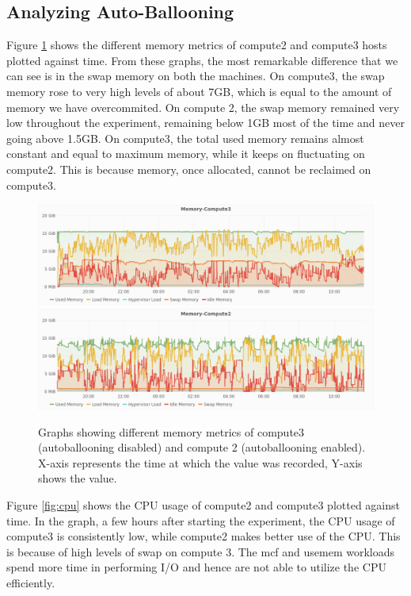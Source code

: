 \subsection{Analyzing Auto-Ballooning}
Figure \ref{fig:mem} shows the different memory metrics of compute2 and compute3 hosts plotted against time. From these graphs, the most remarkable difference that we can see is in the swap memory on both the machines. On compute3, the swap memory rose to very high levels of about 7GB, which is equal to the amount of memory we have overcommited. On compute 2, the swap memory remained very low throughout the experiment, remaining below 1GB most of the time and never going above 1.5GB. On compute3, the total used memory remains almost constant and equal to maximum memory, while it keeps on fluctuating on compute2. This is because memory, once allocated, cannot be reclaimed on compute3.
\begin{figure}
  \centering
  \includegraphics[width=\textwidth]{mem-compute3.png}
   \includegraphics[width=\textwidth]{mem-compute2.png}
  \caption{Graphs showing different memory metrics of compute3 (autoballooning disabled) and compute 2 (autoballooning enabled). X-axis represents the time at which the value was recorded, Y-axis shows the value.}\label{fig:mem}
\end{figure}

Figure \ref{fig:cpu} shows the CPU usage of compute2 and compute3 plotted against time. In the graph, a few hours after starting the experiment, the CPU usage of compute3 is consistently low, while compute2 makes better use of the CPU. This is because of high levels of swap on compute 3. The mcf and usemem workloads spend more time in performing I/O and hence are not able to utilize the CPU efficiently.

